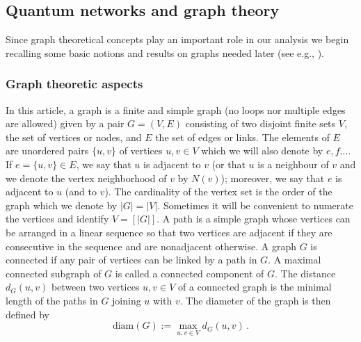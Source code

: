\documentclass[a4paper,onecolumn,accepted=2024-12-14]{quantumarticle}
\theoremstyle{plain}
\begin{document}
\subsection{Quantum networks and graph theory}\label{sec22}

Since graph theoretical concepts play an important role in our analysis we begin recalling some basic notions and results on graphs needed later
(see e.g., \cite{diestel,bondy}).


\subsubsection{Graph theoretic aspects}\label{subsec:GT}
In this article, a graph is a finite and simple graph (no loops nor multiple edges are allowed) given by a pair $G = (V, E)$ consisting of two disjoint finite sets
$V$, the set of vertices or nodes, and $E$ the set of edges or links.
The elements of $E$ are unordered pairs $\{u, v\}$ of vertices $u, v \in V$ which we will also denote by
$e,f\dots$.
If $e=\{u,v\} \in E$, we say that $u$ is adjacent to $v$ (or that $u$ is a
neighbour of $v$ and we denote the vertex neighborhood of $v$ by $N(v)$); moreover, we say that $e$ is adjacent to $u$ (and to $v$).
The cardinality of the vertex set is the order of the graph which we denote by $|G|=|V|$. Sometimes it will be convenient to numerate the vertices and identify $V=[|G|]$.
A path is a simple graph whose vertices can be arranged in a linear sequence so that two vertices are adjacent if they are consecutive in the sequence and are nonadjacent otherwise. A graph $G$ is connected if any pair of vertices can be linked by a path in $G$. A maximal connected subgraph of $G$
is called a connected component of $G$.
The distance $d_G(u,v)$ between two vertices $u,v\in V$ of a connected graph is the minimal length of the paths in $G$ joining $u$ with $v$. The diameter of the graph is then defined by
\begin{equation}
 \mathrm{diam}(G):=\max_{u,v\in V}d_G (u,v)\,.
\end{equation}
\end{document}
